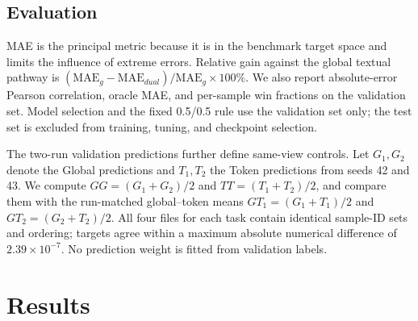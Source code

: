 \documentclass[a4paper,fleqn]{cas-sc}
\begin{document}
\subsection{Evaluation}
MAE is the principal metric because it is in the benchmark target space and limits the influence of extreme errors. Relative gain against the global textual pathway is $(\mathrm{MAE}_g-\mathrm{MAE}_{dual})/\mathrm{MAE}_g\times100\%$. We also report absolute-error Pearson correlation, oracle MAE, and per-sample win fractions on the validation set. Model selection and the fixed 0.5/0.5 rule use the validation set only; the test set is excluded from training, tuning, and checkpoint selection.

The two-run validation predictions further define same-view controls. Let $G_1,G_2$ denote the Global predictions and $T_1,T_2$ the Token predictions from seeds 42 and 43. We compute $GG=(G_1+G_2)/2$ and $TT=(T_1+T_2)/2$, and compare them with the run-matched global--token means $GT_1=(G_1+T_1)/2$ and $GT_2=(G_2+T_2)/2$. All four files for each task contain identical sample-ID sets and ordering; targets agree within a maximum absolute numerical difference of $2.39\times10^{-7}$. No prediction weight is fitted from validation labels.

\FloatBarrier
\section{Results}
\end{document}
